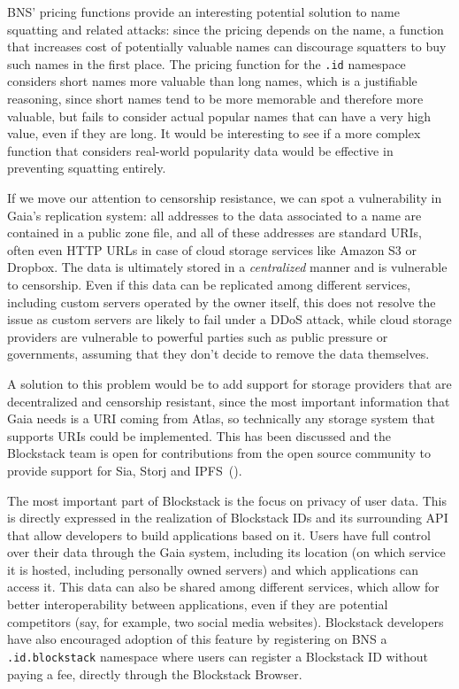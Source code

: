 \documentclass[mscthesis]{usiinfthesis}
\begin{document}
BNS' pricing functions provide an interesting potential solution to name squatting and related attacks: since the pricing depends on the name, a function that increases cost of potentially valuable names can discourage squatters to buy such names in the first place. The pricing function for the \texttt{.id} namespace considers short names more valuable than long names, which is a justifiable reasoning, since short names tend to be more memorable and therefore more valuable, but fails to consider actual popular names that can have a very high value, even if they are long. It would be interesting to see if a more complex function that considers real-world popularity data would be effective in preventing squatting entirely.

If we move our attention to censorship resistance, we can spot a vulnerability in Gaia's replication system: all addresses to the data associated to a name are contained in a public zone file, and all of these addresses are standard URIs, often even HTTP URLs in case of cloud storage services like Amazon S3 or Dropbox. The data is ultimately stored in a \emph{centralized} manner and is vulnerable to censorship. Even if this data can be replicated among different services, including custom servers operated by the owner itself, this does not resolve the issue as custom servers are likely to fail under a DDoS attack, while cloud storage providers are vulnerable to powerful parties such as public pressure or governments, assuming that they don't decide to remove the data themselves.

A solution to this problem would be to add support for storage providers that are decentralized and censorship resistant, since the most important information that Gaia needs is a URI coming from Atlas, so technically any storage system that supports URIs could be implemented. This has been discussed and the Blockstack team is open for contributions from the open source community to provide support for Sia, Storj and IPFS~(\cite{website:gaiaimprovements}).

The most important part of Blockstack is the focus on privacy of user data. This is directly expressed in the realization of Blockstack IDs and its surrounding API that allow developers to build applications based on it. Users have full control over their data through the Gaia system, including its location (on which service it is hosted, including personally owned servers) and which applications can access it. This data can also be shared among different services, which allow for better interoperability between applications, even if they are potential competitors (say, for example, two social media websites). Blockstack developers have also encouraged adoption of this feature by registering on BNS a \texttt{.id.blockstack} namespace where users can register a Blockstack ID without paying a fee, directly through the Blockstack Browser.
\end{document}

